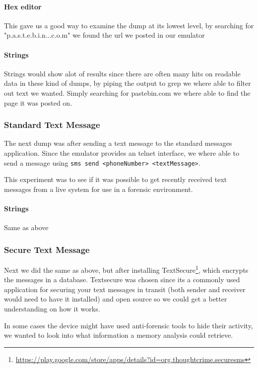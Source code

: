   \paragraph{Hex editor}
  This gave us a good way to examine the dump at its lowest level, by searching for 
  "p.a.s.t.e.b.i.n...c.o.m" we found the url we posted in our emulator

  \paragraph{Strings}
  Strings would show alot of results since there are often many hits on readable 
  data in these kind of dumps, by piping the output to grep we where able to 
  filter out text we wanted. Simply searching for pastebin.com we where able to 
  find the page it was posted on. 
  
  \subsubsection{Standard Text Message}
  The next dump was after sending a text message to the standard messages application. 
  Since the emulator provides an telnet interface, we where able to send a message 
  using \texttt{sms send <phoneNumber> <textMessage>}.
  
  This experiment was to see if it was possible to get recently received text 
  messages from a live system for use in a forensic environment.

  \paragraph{Strings}
  Same as above %
  \subsubsection{Secure Text Message}
  Next we did the same as above, but after installing 
  TextSecure\footnote{\url{https://play.google.com/store/apps/details?id=org.thoughtcrime.securesms}}, 
  which encrypts the messages in a database. Textsecure was chosen since its a commonly 
  used application for securing your text 
  messages in transit (both sender and receiver would need to have it installed) and open source 
  so we could get a better understanding 
  on how it works. 
  
  In some cases the device might have used anti-forensic tools to hide their 
  activity, we wanted to look into what information a memory analysis could 
  retrieve.
